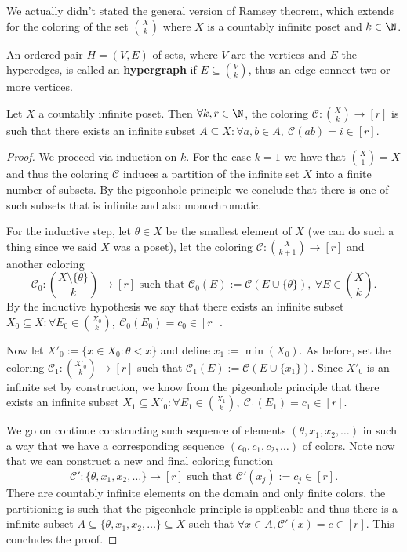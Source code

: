 We actually didn't stated the general version of Ramsey theorem, which extends
for the coloring of the set \(\binom{X}{k}\) where \(X\) is a countably infinite
poset and \(k \in \N\).

\begin{definition}[Hypergraph]
   An ordered pair \(H = (V, E)\) of sets, where \(V\) are the vertices and
   \(E\) the hyperedges, is called an \textbf{hypergraph} if \(E \subseteq
   \binom{V}{k}\), thus an edge connect two or more vertices.
\end{definition}

\begin{theorem}
   Let \(X\) a countably infinite poset. Then \(\forall k, r \in \N\),
   the coloring \(\mathcal{C} : \binom{X}{k} \to [r]\) is such that there exists
   an infinite subset \(A \subseteq X : \forall a, b \in A,\ \mathcal{C}(a b) =
   i \in [r]\).
\end{theorem}

\begin{proof}
   We proceed via induction on \(k\). For the case \(k = 1\) we have that
   \(\binom{X}{1} = X\) and thus the coloring \(\mathcal{C}\) induces a
   partition of the infinite set \(X\) into a finite number of subsets. By the
   pigeonhole principle we conclude that there is one of such subsets that is
   infinite and also monochromatic.

   For the inductive step, let \(\theta \in X\) be the smallest element of \(X\)
   (we can do such a thing since we said \(X\) was a poset), let the coloring
   \(\mathcal{C} : \binom{X}{k + 1} \to [r]\) and another coloring
   \[
      \mathcal{C}_0 : \binom{X \setminus \{\theta\} }{k} \to [r]
      \text{ such that }
      \mathcal{C}_0(E) := \mathcal{C}(E \cup \{\theta\} ),\ \forall E \in
      \binom{X}{k}.
   \]
   By the inductive hypothesis we say that there exists an infinite subset
   \(X_0 \subseteq X : \forall E_0 \in \binom{X_0}{k},\ \mathcal{C}_0(E_0) = c_0
   \in [r]\).

   Now let \(X'_0 := \{x \in X_0: \theta < x\}\) and define \(x_1 :=
   \min(X_0)\). As before, set the coloring \(\mathcal{C}_1 : \binom{X'_0}{k}
   \to [r]\) such that \(\mathcal{C}_1(E) := \mathcal{C}(E \cup \{x_1\})\).
   Since \(X'_0\) is an infinite set by construction, we know from the pigeonhole
   principle that there exists an infinite subset \(X_1 \subseteq X'_0 : \forall
   E_1 \in \binom{X_1}{k},\ \mathcal{C}_1 (E_1) = c_1 \in [r]\).

   We go on continue constructing such sequence of elements \((\theta, x_1, x_2,
   \dots)\) in such a way that we have a corresponding sequence  \((c_0, c_1,
   c_2, \dots)\) of colors. Note now that we can construct a new and final
   coloring function
    \[
       \mathcal{C}' : \{\theta, x_1, x_2, \dots\} \to [r] \text{ such that }
       \mathcal{C}'(x_j) := c_j \in [r].
   \]
   There are countably infinite elements on the domain and only finite colors,
   the partitioning is such that the pigeonhole principle is applicable and thus
   there is a infinite subset \(A \subseteq \{\theta, x_1, x_2, \dots\}
   \subseteq X\) such that \(\forall x \in A, \mathcal{C}'(x) = c \in [r]\).
   This concludes the proof.
\end{proof}

